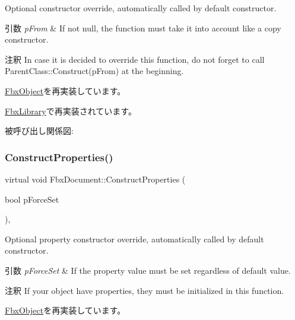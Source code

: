 Optional constructor override, automatically called by default constructor. 
\begin{DoxyParams}{引数}
{\em p\+From} & If not null, the function must take it into account like a copy constructor. \\
\hline
\end{DoxyParams}
\begin{DoxyRemark}{注釈}
In case it is decided to override this function, do not forget to call Parent\+Class\+::\+Construct(p\+From) at the beginning. 
\end{DoxyRemark}


\hyperlink{class_fbx_object_a313503bc645af3fdceb4a99ef5cea7eb}{Fbx\+Object}を再実装しています。



\hyperlink{class_fbx_library_a8e9fbf97f6753d859411f284db16f964}{Fbx\+Library}で再実装されています。

被呼び出し関係図\+:
\mbox{\label{class_fbx_document_a10a4a36c6d252d72036abc1f9d02aeee}} 
\subsubsection{\texorpdfstring{Construct\+Properties()}{ConstructProperties()}}
{\footnotesize\ttfamily virtual void Fbx\+Document\+::\+Construct\+Properties (\begin{DoxyParamCaption}\item[{bool}]{p\+Force\+Set }\end{DoxyParamCaption})\hspace{0.3cm}{\ttfamily [protected]}, {\ttfamily [virtual]}}

Optional property constructor override, automatically called by default constructor. 
\begin{DoxyParams}{引数}
{\em p\+Force\+Set} & If the property value must be set regardless of default value. \\
\hline
\end{DoxyParams}
\begin{DoxyRemark}{注釈}
If your object have properties, they must be initialized in this function. 
\end{DoxyRemark}


\hyperlink{class_fbx_object_ad44f814323dc1b5e78bff1bfc608b4bb}{Fbx\+Object}を再実装しています。


